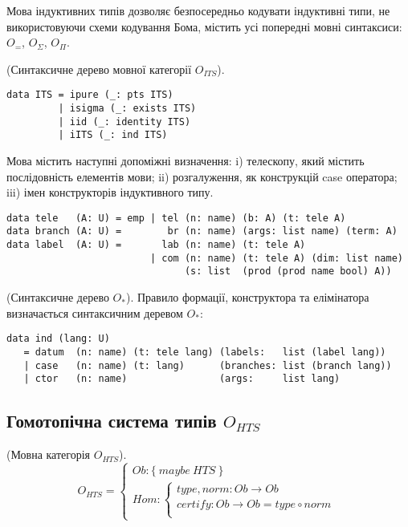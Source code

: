 Мова індуктивних типів дозволяє безпосередньо кодувати індуктивні типи,
не використовуючи схеми кодування Бома, містить усі попередні мовні синтаксиси:
$O_=$, $O_\Sigma$, $O_\Pi$.

\begin{definition} (Синтаксичне дерево мовної категорії $O_{ITS}$).
\begin{lstlisting}
data ITS = ipure (_: pts ITS)
         | isigma (_: exists ITS)
         | iid (_: identity ITS)
         | iITS (_: ind ITS)
\end{lstlisting}
\end{definition}

Мова містить наступні допоміжні визначення: i) телескопу,
який містить послідовність елементів мови; ii) розгалуження,
як конструкцій case оператора; iii) імен конструкторів індуктивного типу.

\begin{lstlisting}
data tele   (A: U) = emp | tel (n: name) (b: A) (t: tele A)
data branch (A: U) =        br (n: name) (args: list name) (term: A)
data label  (A: U) =       lab (n: name) (t: tele A)
                         | com (n: name) (t: tele A) (dim: list name)
                               (s: list  (prod (prod name bool) A))
\end{lstlisting}

\begin{definition} (Синтаксичне дерево $O_*$).
Правило формації, конструктора та елімінатора визначається синтаксичним деревом $O_*$:
\begin{lstlisting}
data ind (lang: U)
   = datum  (n: name) (t: tele lang) (labels:   list (label lang))
   | case   (n: name) (t: lang)      (branches: list (branch lang))
   | ctor   (n: name)                (args:     list lang)
\end{lstlisting}
\end{definition}

\subsection{Гомотопічна система типів $O_{HTS}$}

\begin{definition} (Мовна категорія $O_{HTS}$).
$$
O_{HTS} =
\begin{cases}
Ob: \{\ maybe\ HTS\ \} \\
Hom: \begin{cases}
type,norm: Ob \rightarrow Ob \\
certify: Ob \rightarrow Ob = type \circ norm \\
\end{cases}
\end{cases}
$$
\end{definition}

